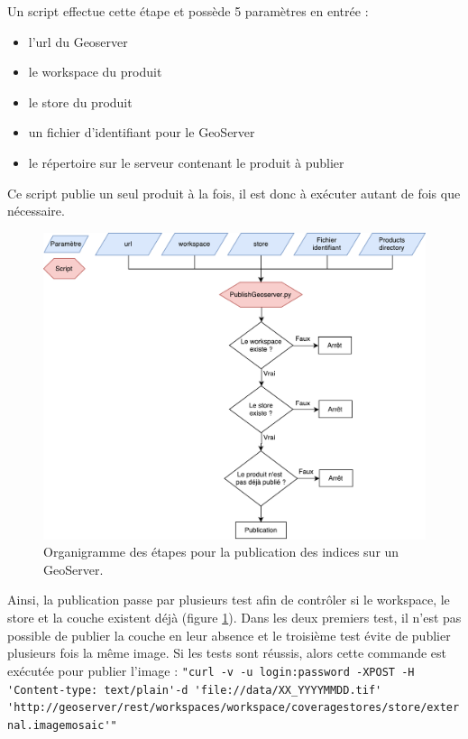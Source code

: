 \documentclass[10pt,a4paper]{article}
\begin{document}
Un script effectue cette étape et possède 5 paramètres en entrée :

\begin{itemize}
\item l'url du Geoserver
\item le workspace du produit
\item le store du produit
\item un fichier d'identifiant pour le GeoServer
\item le répertoire sur le serveur contenant le produit à publier
\end{itemize}

Ce script publie un seul produit à la fois, il est donc à exécuter autant de fois que nécessaire.\newpage

\begin{figure}[!h]
\centering
\includegraphics[scale=0.5]{img/orgPublication.pdf}
\caption{Organigramme des étapes pour la publication des indices sur un GeoServer.}
\label{orgPublication}
\end{figure}

Ainsi, la publication passe par plusieurs test afin de contrôler si le workspace, le store et la couche existent déjà (figure \ref{orgPublication}). Dans les deux premiers test, il n'est pas possible de publier la couche en leur absence et le troisième test évite de publier plusieurs fois la même image.\smallbreak
Si les tests sont réussis, alors cette commande est exécutée pour publier l'image :\newline 
\verb!"curl -v -u login:password -XPOST -H 'Content-type: text/plain'!\newline \verb!-d 'file://data/XX_YYYYMMDD.tif' 'http://geoserver/rest!\newline \verb!/workspaces/workspace/coveragestores/store/external.imagemosaic'"!
\end{document}
